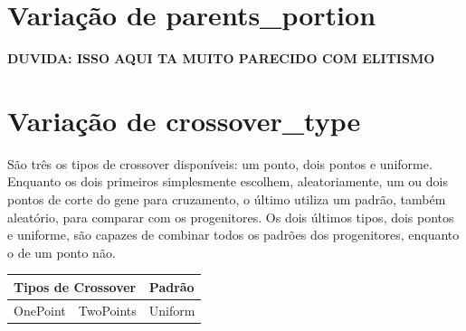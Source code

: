 \documentclass[12pt]{article}
\begin{document}
\section{Variação de parents\_portion}

\textbf{DUVIDA: ISSO AQUI TA MUITO PARECIDO COM ELITISMO}

\section{Variação de crossover\_type}

São três os tipos de crossover disponíveis: um ponto, dois pontos e uniforme. Enquanto os dois primeiros simplesmente escolhem, aleatoriamente, um ou dois pontos de corte do gene para cruzamento, o último utiliza um padrão, também aleatório, para comparar com os progenitores. Os dois últimos tipos, dois pontos e uniforme, são capazes de combinar todos os padrões dos progenitores, enquanto o de um ponto não.

\begin{table}[H]
	\centering
	\begin{tabular}{|l|l|l|}
		\hline
		\multicolumn{2}{|l|}{Tipos de Crossover}&Padrão \\ \hline
		OnePoint    & TwoPoints    & Uniform    \\ \hline
	\end{tabular}
\end{table}
	
	 
	
\end{document}
